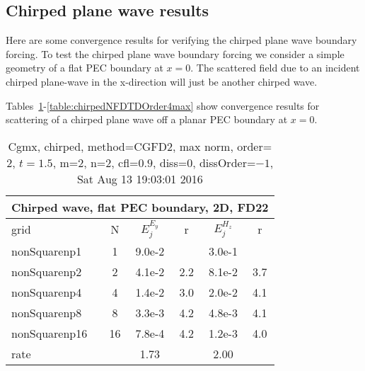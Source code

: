 \subsection{Chirped plane wave results} \label{sec:chirpedPlaneWaveResults}


Here are some convergence results for verifying the chirped plane wave boundary forcing.
To test the chirped plane wave boundary forcing we consider a simple geometry of a flat
PEC boundary at $x=0$. The scattered field due to an incident chirped plane-wave in the x-direction will just be
another chirped wave. 

Tables~\ref{table:chirpedNFDTDOrder2max}-\ref{table:chirpedNFDTDOrder4max} show convergence results for
scattering of a chirped plane wave off a planar PEC boundary at $x=0$. 

\newcommand{\tableFont}{\small}
{
\newcommand{\convTitle}{Chirped wave, flat PEC boundary, 2D, FD22}%
\newcommand{\strutt}{\rule{0pt}{9pt}}%
\newcommand{\num}[2]{#1e{#2}}%
\newcommand{\erruA}{$E_j^{E_y}$}%
\newcommand{\erruB}{$E_j^{H_z}$}%
%
\begin{table}[hbt]\tableFont %
\begin{center}
\begin{tabular}{|l|c|c|c|c|c|} \hline 
  \multicolumn{6}{|c|}{\convTitle} \\ \hline 
    grid      &  N   &     \erruA     &  r   &     \erruB     &  r    \\ \hline 
  nonSquarenp1 &   1  & \num{9.0}{-2} &      & \num{3.0}{-1} &     \\ \hline
  nonSquarenp2 &   2  & \num{4.1}{-2} & 2.2  & \num{8.1}{-2} & 3.7 \\ \hline
  nonSquarenp4 &   4  & \num{1.4}{-2} & 3.0  & \num{2.0}{-2} & 4.1 \\ \hline
  nonSquarenp8 &   8  & \num{3.3}{-3} & 4.2  & \num{4.8}{-3} & 4.1 \\ \hline
  nonSquarenp16 &   16  & \num{7.8}{-4} & 4.2  & \num{1.2}{-3} & 4.0 \\ \hline
  rate        &      &    1.73       &      &    2.00       &      \\ \hline
\end{tabular}
\caption{Cgmx, chirped, method=CGFD2, max norm, order=$2$, $t=1.5$, m=2,  n=2, cfl=$0.9$, diss=$0$, dissOrder=$-1$, Sat Aug 13 19:03:01 2016}\label{table:chirpedNFDTDOrder2max}
\end{center}
\end{table}
}

